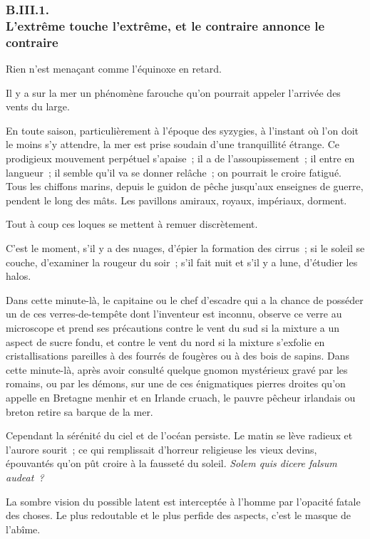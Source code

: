 \documentclass[french,twoside]{book} %
\begin{document}
  \subsubsection[{B.III.1. L’extrême touche l’extrême, et le contraire annonce le contraire}]{B.III.1. \\
L’extrême touche l’extrême, et le contraire annonce le contraire}
\noindent Rien n’est menaçant comme l’équinoxe en retard.\par
Il y a sur la mer un phénomène farouche qu’on pourrait appeler l’arrivée des vents du large.\par
En toute saison, particulièrement à l’époque des syzygies, à l’instant où l’on doit le moins s’y attendre, la mer est prise soudain d’une tranquillité étrange. Ce prodigieux mouvement perpétuel s’apaise ; il a de l’assoupissement ; il entre en langueur ; il semble qu’il va se donner relâche ; on pourrait le croire fatigué. Tous les chiffons marins, depuis le guidon de pêche jusqu’aux enseignes de guerre, pendent le long des mâts. Les pavillons amiraux, royaux, impériaux, dorment.\par
Tout à coup ces loques se mettent à remuer discrètement.\par
C’est le moment, s’il y a des nuages, d’épier la formation des cirrus ; si le soleil se couche, d’examiner  la rougeur du soir ; s’il fait nuit et s’il y a lune, d’étudier les halos.\par
Dans cette minute-là, le capitaine ou le chef d’escadre qui a la chance de posséder un de ces verres-de-tempête dont l’inventeur est inconnu, observe ce verre au microscope et prend ses précautions contre le vent du sud si la mixture a un aspect de sucre fondu, et contre le vent du nord si la mixture s’exfolie en cristallisations pareilles à des fourrés de fougères ou à des bois de sapins. Dans cette minute-là, après avoir consulté quelque gnomon mystérieux gravé par les romains, ou par les démons, sur une de ces énigmatiques pierres droites qu’on appelle en Bretagne menhir et en Irlande cruach, le pauvre pêcheur irlandais ou breton retire sa barque de la mer.\par
Cependant la sérénité du ciel et de l’océan persiste. Le matin se lève radieux et l’aurore sourit ; ce qui remplissait d’horreur religieuse les vieux devins, épouvantés qu’on pût croire à la fausseté du soleil. \emph{Solem quis dicere falsum audeat ?}\par
La sombre vision du possible latent est interceptée à l’homme par l’opacité fatale des choses. Le plus redoutable et le plus perfide des aspects, c’est le masque de l’abîme.\par
\end{document}
